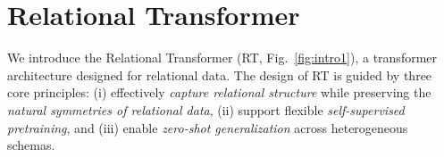 \section{Relational Transformer}
\label{sec:architecture}




We introduce the Relational Transformer (RT, Fig.~\ref{fig:intro1}), a transformer architecture designed for relational data. The design of RT is guided by three core principles:
(i) effectively \emph{capture relational structure} while preserving the \emph{natural symmetries of relational data}, (ii) support flexible \emph{self-supervised pretraining}, and (iii) enable \emph{zero-shot generalization} across heterogeneous schemas.








